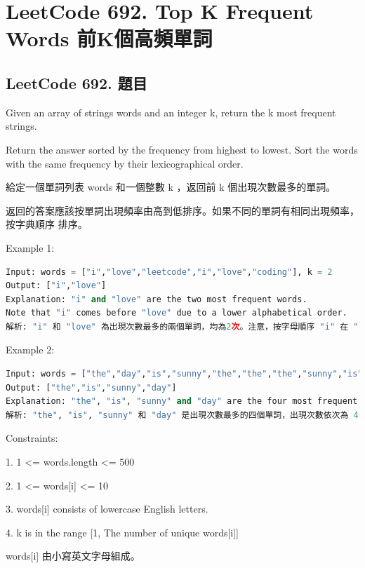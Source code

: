 \documentclass[10pt,UTF8]{ctexart}
\begin{document}
\newpage

\section{LeetCode 692. Top K Frequent Words 前K個高頻單詞}

\subsection{LeetCode 692. 題目}

Given an array of strings words and an integer k, return the k most frequent strings.

Return the answer sorted by the frequency from highest to lowest. Sort the words with the same frequency by their lexicographical order.

給定一個單詞列表 words 和一個整數 k ，返回前 k 個出現次數最多的單詞。

返回的答案應該按單詞出現頻率由高到低排序。如果不同的單詞有相同出現頻率， 按字典順序 排序。

Example 1:

\begin{lstlisting}[language={python}]
Input: words = ["i","love","leetcode","i","love","coding"], k = 2
Output: ["i","love"]
Explanation: "i" and "love" are the two most frequent words.
Note that "i" comes before "love" due to a lower alphabetical order.
解析: "i" 和 "love" 為出現次數最多的兩個單詞，均為2次。注意，按字母順序 "i" 在 "love" 之前。
\end{lstlisting}


Example 2:

\begin{lstlisting}[language={python}]
Input: words = ["the","day","is","sunny","the","the","the","sunny","is","is"], k = 4
Output: ["the","is","sunny","day"]
Explanation: "the", "is", "sunny" and "day" are the four most frequent words, with the number of occurrence being 4, 3, 2 and 1 respectively.
解析: "the", "is", "sunny" 和 "day" 是出現次數最多的四個單詞，出現次數依次為 4, 3, 2 和 1 次。
\end{lstlisting}


Constraints:

1. 1 <= words.length <= 500

2. 1 <= words[i] <= 10

3. words[i] consists of lowercase English letters.

4. k is in the range [1, The number of unique words[i]]

words[i] 由小寫英文字母組成。
\end{document}
